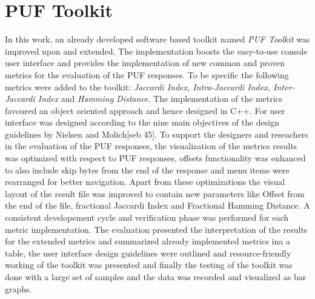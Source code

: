 \section{PUF Toolkit}
In this work, an already developed software based toolkit named \emph{PUF Toolkit} was improved upon and extended. The implementation boosts the easy-to-use console user interface and provides the implementation of new common and proven metrics for the evaluation of the PUF responses. To be specific the following metrics were added to the toolkit: \emph{Jaccardi Index, Intra-Jaccardi Index, Inter-Jaccardi Index} and \emph{Hamming Distance}. The implementation of the metrics favoured an object
oriented approach and hence designed in C++. For user interface was designed according to the nine main objectives of the design guidelines by Nielsen and Molich[seb 45]. To support the designers and reseachers in the evaluation of the PUF responses, the visualization of the metrics results was optimized with respect to PUF responses, offsets functionality was enhanced to also include skip bytes from the end of the response and menu items were rearranged for better navigation. Apart from
these optimizations the visual layout of the result file was improved to contain new parameters like Offset from the end of the file, fractional Jaccardi Index and Fractional Hamming Distance. A consistent developement cycle and verification phase was performed for each metric implementation. The evaluation presented the interpretation of the results for the extended metrics and summarized already implemented metrics ina a table, the user interface design guidelines were outlined
and resource-friendly working of the toolkit was presented and finally the testing of the toolkit was done with a large set of samples and the data was recorded and visualized as bar graphs.\\

